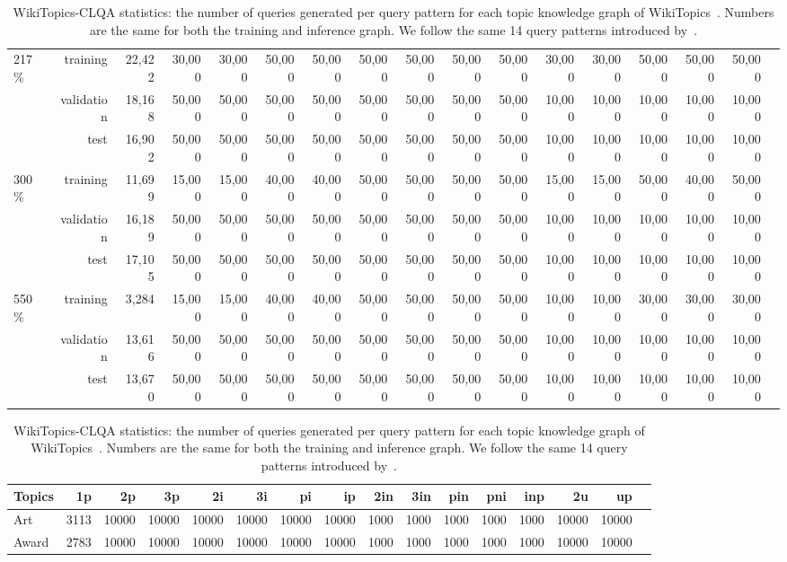 \begin{table}[!ht]
\begin{adjustbox}{width=\textwidth}
\begin{tabular}{lrrrrrrrrrrrrrrrr}
\multirow{3}{*}{217\%} & training & 22,422 &30,000 &30,000 &50,000 &50,000 &50,000 &50,000 &50,000 &50,000 &30,000 &30,000 &50,000 &50,000 &50,000 \\
&validation & 18,168 &50,000 &50,000 &50,000 &50,000 &50,000 &50,000 &50,000 &50,000 &10,000 &10,000 &10,000 &10,000 &10,000 \\
&test & 16,902 &50,000 &50,000 &50,000 &50,000 &50,000 &50,000 &50,000 &50,000 &10,000 &10,000 &10,000 &10,000 &10,000 \\ \midrule
\multirow{3}{*}{300\%} &training & 11,699 &15,000 &15,000 &40,000 &40,000 &50,000 &50,000 &50,000 &50,000 &15,000 &15,000 &50,000 &40,000 &50,000 \\
&validation & 16,189 &50,000 &50,000 &50,000 &50,000 &50,000 &50,000 &50,000 &50,000 &10,000 &10,000 &10,000 &10,000 &10,000 \\
&test & 17,105 &50,000 &50,000 &50,000 &50,000 &50,000 &50,000 &50,000 &50,000 &10,000 &10,000 &10,000 &10,000 &10,000 \\ \midrule
\multirow{3}{*}{550\%} &training & 3,284 &15,000 &15,000 &40,000 &40,000 &50,000 &50,000 &50,000 &50,000 &10,000 &10,000 &30,000 &30,000 &30,000 \\
&validation & 13,616 &50,000 &50,000 &50,000 &50,000 &50,000 &50,000 &50,000 &50,000 &10,000 &10,000 &10,000 &10,000 &10,000 \\
&test & 13,670 &50,000 &50,000 &50,000 &50,000 &50,000 &50,000 &50,000 &50,000 &10,000 &10,000 &10,000 &10,000 &10,000 \\ 
\bottomrule
\end{tabular}
\end{adjustbox}
%
\centering
\caption{WikiTopics-CLQA statistics: the number of queries generated per query pattern for each topic knowledge graph of WikiTopics~\citep{isdea}. Numbers are the same for both the training and inference graph.  We follow the same 14 query patterns introduced by~\citet{betae}.}
\begin{adjustbox}{width=\textwidth}
\begin{tabular}{lrrrrrrrrrrrrrrr}\toprule
Topics & \bf{1p} & \bf{2p} & \bf{3p} & \bf{2i} & \bf{3i} & \bf{pi} & \bf{ip} & \bf{2in} & \bf{3in} & \bf{pin} & \bf{pni} & \bf{inp} & \bf{2u} & \bf{up} \\
\midrule
Art & 3113 & 10000 & 10000 & 10000 & 10000 & 10000 & 10000 & 1000 & 1000 & 1000 & 1000 & 1000 & 10000 & 10000 \\
Award & 2783 & 10000 & 10000 & 10000 & 10000 & 10000 & 10000 & 1000 & 1000 & 1000 & 1000 & 1000 & 10000 & 10000 \\

\end{tabular}
\end{adjustbox}
\end{table}
